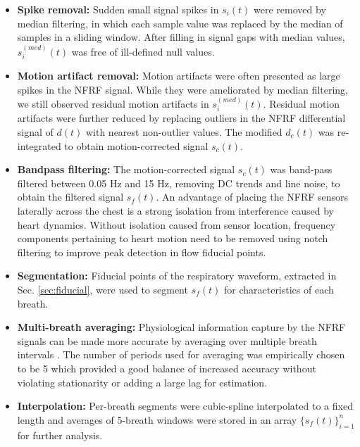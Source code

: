 \documentclass[journal,twoside,web]{ieeecolor}
\begin{document}
\begin{itemize}
    \item \textbf{Spike removal:} Sudden small signal spikes in $s_{i}(t)$ were removed by median filtering, in which each sample value was replaced by the median of samples in a sliding window. After filling in signal gaps with median values, $s_{i}^{(med)}(t)$ was free of ill-defined null values. 
    \item \textbf{Motion artifact removal:} Motion artifacts were often presented as large spikes in the NFRF signal. While they were ameliorated by median filtering, we still observed residual motion artifacts in $s_{i}^{(med)}(t)$. Residual motion artifacts were further reduced by replacing outliers in the NFRF differential signal of $d(t)$ with nearest non-outlier values. The modified $d_{c}(t)$ was re-integrated to obtain motion-corrected signal $s_{c}(t)$.
    \item \textbf{Bandpass filtering:} The motion-corrected signal $s_{c}(t)$ was band-pass filtered between 0.05 Hz and 15 Hz, removing DC trends and line noise, to obtain the filtered signal $s_f (t)$. An advantage of placing the NFRF sensors laterally across the chest is a strong isolation from interference caused by heart dynamics. Without isolation caused from sensor location, frequency components pertaining to heart motion need to be removed using notch filtering to improve peak detection in flow fiducial points. 
    \item \textbf{Segmentation:} Fiducial points of the respiratory waveform, extracted in Sec. \ref{sec:fiducial}, were used to segment $s_f (t)$ for characteristics of each breath.   
    \item \textbf{Multi-breath averaging:} Physiological information capture by the NFRF signals can be made more accurate by averaging over multiple breath intervals \cite{conroyHeartIDBiometric2023}. The number of periods used for averaging was empirically chosen to be 5 which provided a good balance of increased accuracy without violating stationarity or adding a large lag for estimation. 
    \item \textbf{Interpolation:} Per-breath segments were cubic-spline interpolated to a fixed length and averages of 5-breath windows were stored in an array $\{s_f (t)\}_{i=1}^{n}$ for further analysis.
\end{itemize} 
\end{document}
